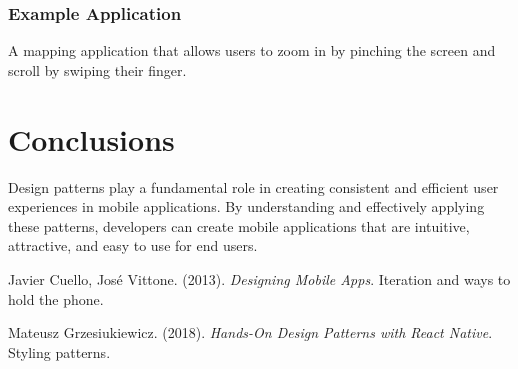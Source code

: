 \documentclass[conference]{IEEEtran}
\begin{document}
\subsubsection{Example Application}
A mapping application that allows users to zoom in by pinching the screen and scroll by swiping their finger.

\section{Conclusions}
Design patterns play a fundamental role in creating consistent and efficient user experiences in mobile applications. By understanding and effectively applying these patterns, developers can create mobile applications that are intuitive, attractive, and easy to use for end users.

\begin{thebibliography}{1}
Javier Cuello, José Vittone. (2013). \textit{Designing Mobile Apps}. Iteration and ways to hold the phone.

Mateusz Grzesiukiewicz. (2018). \textit{Hands-On Design Patterns with React Native}. Styling patterns.
\end{thebibliography}
\end{document}
